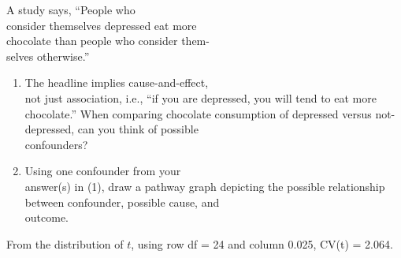 \documentclass[11pt, chapterprefix=true]{scrbook}\usepackage[]{graphicx}\usepackage[]{color}
\begin{document}
\begin{exercises}
  \begin{exercise} %

A study says, ``People who \\ consider themselves depressed eat more \\ chocolate than people who consider them- \\ selves otherwise.''

\begin{enumerate}
\item The headline implies cause-and-effect, \\ not just association, i.e., ``if you are depressed, you will tend to eat more \\ chocolate.''   When comparing chocolate consumption of depressed versus not-depressed, can you think of possible  \\ confounders?
  \item Using one confounder from your \\ answer(s) in (1), draw a pathway graph depicting the possible relationship between confounder, possible cause, and \\ outcome.
\end{enumerate}
  \end{exercise}
  \begin{solution}  %


    From the distribution of $t$, using row df = 24 and column 0.025, CV(t) = 2.064.
  \end{solution}


  \begin{exercise} %


\end{exercise}
\end{exercises}
\end{document}

